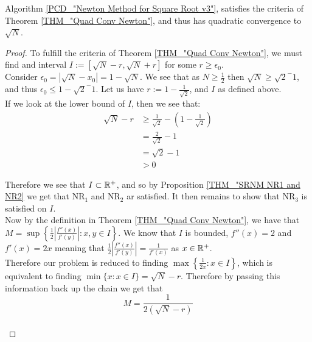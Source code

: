 \begin{SRNM NR3 for v3}
\label{THM_"NR3 for v3"}
Algorithm \ref{PCD_"Newton Method for Square Root v3"}, satisfies the criteria of Theorem \ref{THM_"Quad Conv Newton"}, and thus has quadratic convergence to \(\sqrt{N}\).
\end{SRNM NR3 for v3}
\begin{proof}
To fulfill the criteria of Theorem \ref{THM_"Quad Conv Newton"}, we must find and interval \(I := [\sqrt{N}-r, \sqrt{N} + r]\) for some \(r \ge \epsilon_0\).\\

Consider \(\epsilon_0 = |\sqrt{N} - x_0| = 1 - \sqrt{N}\). We see that as \(N \ge \frac{1}{2}\) then \(\sqrt{N} \ge \sqrt{2}^-1\), and thus \(\epsilon_0 \le 1 - \sqrt{2}^-1\). Let us have \(r := 1 - \frac{1}{\sqrt{2}}\), and \(I\) as defined above.\\

If we look at the lower bound of \(I\), then we see that:
\begin{displaymath}
\begin{align*}
\sqrt{N} - r &\ge \frac{1}{\sqrt{2}} - (1 - \frac{1}{\sqrt{2}})\\
	&= \frac{2}{\sqrt{2}} - 1\\
	&= \sqrt{2} - 1 \\
	&> 0
\end{align*}
\end{displaymath}

Therefore we see that \(I \subset \mathbb{R}^+\), and so by Proposition \ref{THM_"SRNM NR1 and NR2} we get that \(\mathrm{NR}_1\) and \(\mathrm{NR}_2\) ar satisfied. It then remains to show that \(\mathrm{NR}_3\) is satisfied on \(I\).\\

Now by the definition in Theorem \ref{THM_"Quad Conv Newton"}, we have that \(M = \sup\left\{\frac{1}{2}\left|\frac{f''(x)}{f'(y)}\right| : x, y \in I\right\}\). We know that \(I\) is bounded, \(f''(x) = 2\) and \(f'(x) = 2x\) meaning that \(\frac{1}{2}\left|\frac{f''(x)}{f'(y)}\right| = \frac{1}{f'(x)}\) as \(x \in \mathbb{R}^+\).\\ 

Therefore our problem is reduced to finding \(\max\left\{\frac{1}{2x} : x \in I\right\}\), which is equivalent to finding \(\min\{x : x \in I\} = \sqrt{N} - r\). Therefore by passing this information back up the chain we get that \[M = \frac{1}{2(\sqrt{N} - r)}\]\\


\end{proof}
